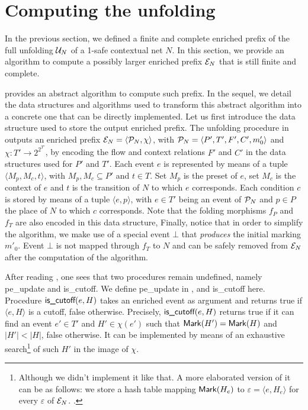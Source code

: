 \documentclass[11pt,a4paper]{article}
\newcommand{\peupdate}{\mbox{\sf pe\_update}}
\newcommand{\iscutoff}{\mbox{\sf is\_cutoff}}
\begin{document}
\section{Computing the unfolding}

In the previous section, we defined a finite and complete enriched prefix of
the full unfolding $\mathcal{U}_{N}$ of a 1-safe contextual net $N$.  In this section,
we provide an algorithm to compute a possibly larger enriched prefix $\mathcal{E}_{N}$
that is still finite and complete.

 provides an abstract algorithm to compute such prefix.  In
the sequel, we detail the data structures and algorithms used to transform this
abstract algorithm into a concrete one that can be directly implemented.  Let
us first introduce the data structure used to store the output enriched prefix.
The unfolding procedure in  outputs an enriched
prefix $\mathcal{E}_{N} = \langle \mathcal{P}_{N}, \chi \rangle$, with $\mathcal{P}_{N} = \langle P',
T', F', C', m'_0 \rangle$ and $\chi : T' \to 2^{2^{T'}}$, by encoding the flow
and context relations $F'$ and $C'$ in the data structures used for $P'$ and
$T'$.  Each event $e$ is represented by means of a tuple $\langle M_p, M_c, t
\rangle$, with $M_p, M_c \subseteq P'$ and $t \in T$.  Set $M_p$ is the preset
of $e$, set $M_c$ is the context of $e$ and $t$ is the transition of $N$ to
which $e$ corresponds.  Each condition $c$ is stored by means of a tuple
$\langle e, p \rangle$, with $e \in T'$ being an event of $\mathcal{P}_{N}$ and $p \in
P$ the place of $N$ to which $c$ corresponds.  Note that the folding morphisms
$f_P$ and $f_T$ are also encoded in this data structure, 
Finally, notice that in order to simplify the algorithm, we make use of a
special event $\bot$ that \textit{produces} the initial marking $m'_0$.  Event
$\bot$ is not mapped through $f_T$ to $N$ and can be safely removed from $\mathcal{E}_{N}$ after the computation of the algorithm.

 After reading , one sees
that two procedures remain undefined, namely \peupdate{} and \iscutoff{}.  We
define \peupdate{} in , and \iscutoff{} here.
Procedure $\iscutoff (e, H)$ takes an enriched event as argument and returns
true if $\langle e, H \rangle$ is a cutoff, false otherwise.  Precisely,
$\iscutoff (e, H)$ returns true if it can find an event $e' \in T'$ and $H' \in
\chi (e')$ such that $\mathsf{Mark }{(H')} = \mathsf{Mark }{(H)}$ and $|H'| < |H|$, false
otherwise.  It can be implemented by means of an exhaustive
search\footnote{Although we didn't implement it like that.  A more elaborated
version of it can be as follows:  we store a hash table mapping $\mathsf{Mark }{(H_e)}$
to $\varepsilon = \langle e, H_e \rangle$ for every $\varepsilon$ of $\mathcal{E}_{N}$.
.} of such $H'$ in the image of $\chi$.
\end{document}
